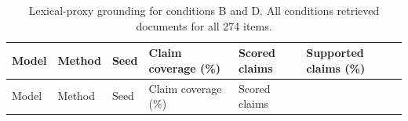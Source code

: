\begin{landscape}
\begingroup\scriptsize\setlength{\tabcolsep}{3pt}\sloppy
\begin{longtable}[]{@{}
  >{\raggedright\arraybackslash}p{}
  >{\raggedright\arraybackslash}p{}
  >{\raggedleft\arraybackslash}p{}
  >{\raggedleft\arraybackslash}p{}
  >{\raggedleft\arraybackslash}p{}
  >{\raggedleft\arraybackslash}p{}@{}}
\caption{Lexical-proxy grounding for conditions B and D. All conditions retrieved documents for all 274 items.}\tabularnewline
\toprule\noalign{}
\begin{minipage}[b]{\linewidth}\raggedright
Model
\end{minipage} & \begin{minipage}[b]{\linewidth}\raggedright
Method
\end{minipage} & \begin{minipage}[b]{\linewidth}\raggedleft
Seed
\end{minipage} & \begin{minipage}[b]{\linewidth}\raggedleft
Claim coverage (\%)
\end{minipage} & \begin{minipage}[b]{\linewidth}\raggedleft
Scored claims
\end{minipage} & \begin{minipage}[b]{\linewidth}\raggedleft
Supported claims (\%)
\end{minipage} \\
\midrule\noalign{}
\endfirsthead
\toprule\noalign{}
\begin{minipage}[b]{\linewidth}\raggedright
Model
\end{minipage} & \begin{minipage}[b]{\linewidth}\raggedright
Method
\end{minipage} & \begin{minipage}[b]{\linewidth}\raggedleft
Seed
\end{minipage} & \begin{minipage}[b]{\linewidth}\raggedleft
Claim coverage (\%)
\end{minipage} & \begin{minipage}[b]{\linewidth}\raggedleft
Scored claims
\end{minipage} & \begin{minipage}[b]{\linewidth}\raggedleft

\end{minipage}
\end{longtable}
\end{landscape}

